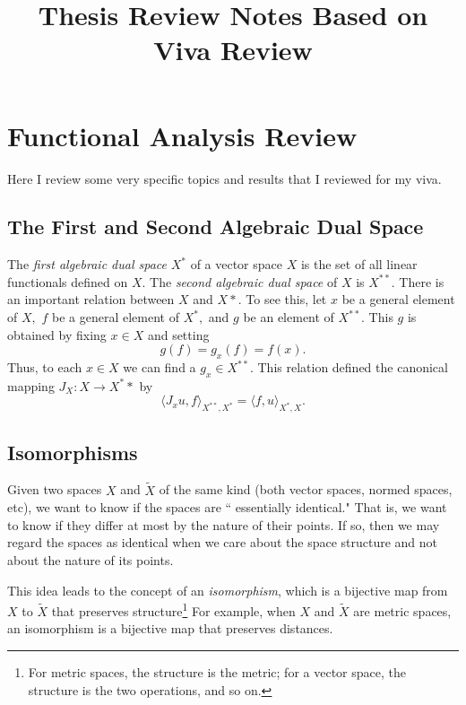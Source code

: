 \documentclass[12pt,a4paper]{article}
\title{\textbf{Thesis Review Notes Based on Viva Review}}
\author{}
\date{}
\theoremstyle{boldthm}
\theoremstyle{bolddefn}
\begin{document}
\maketitle
\tableofcontents
\newpage %



\section{Functional Analysis Review}

Here I review some very specific topics and results that I reviewed for my viva. 

\subsection{The First and Second Algebraic Dual Space \cite[pg. 106-107]{krey} }

The \textit{first algebraic dual space} $X^*$ of a vector space $X$ is the set of all linear functionals defined on $X.$ The \textit{second algebraic dual space} of $X$ is $X^{**}.$ There is an important relation between $X$ and $X*.$ To see this, let $x$ be a general element of $X,$ $f$ be a general element of $X^*,$ and $g$ be an element of $X^{**}.$ This $g$ is obtained by fixing $x \in X$ and setting
\begin{equation}
    g(f) =g_x(f) = f(x).
\end{equation}
Thus, to each $x \in X$ we can find a $g_x \in X^{**}.$ This relation defined the canonical mapping $J_X : X \rightarrow X^**$ by
\begin{equation}
    \langle J_x u, f \rangle_{X^{**}, X^*} = \langle f, u \rangle_{X^*, X}.
\end{equation}

\subsection{Isomorphisms \cite[pg. 108]{krey} }

Given two spaces $X$ and $\tilde X$ of the same kind (both vector spaces, normed spaces, etc), we want to know if the spaces are `` essentially identical." That is, we want to know if they differ at most by the nature of their points. If so, then we may regard the spaces as identical when we care about the space structure and not about the nature of its points. 

This idea leads to the concept of an \textit{isomorphism}, which is a bijective map from $X$ to $\tilde X$ that preserves structure\footnote{For metric spaces, the structure is the metric; for a vector space, the structure is the two operations, and so on.} For example, when $X$ and $\tilde X$ are metric spaces, an isomorphism is a bijective map that preserves distances. 
\end{document}
